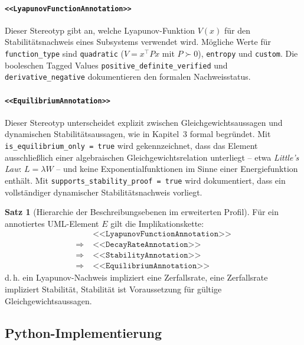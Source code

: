 ﻿\documentclass[a4paper,12pt]{report}
\theoremstyle{definition}
\newtheorem{satz}{Satz}[section]
\begin{document}
\paragraph{\texttt{<<LyapunovFunctionAnnotation>>}}

Dieser Stereotyp gibt an, welche Lyapunov-Funk\-tion $V(x)$ für den
Stabilitätsnachweis eines Subsystems verwendet wird. Mögliche Werte für
\texttt{function\_type} sind \texttt{quadratic} ($V = x^\top P x$ mit
$P \succ 0$), \texttt{entropy} und \texttt{custom}. Die booleschen Tagged
Values \texttt{positive\_definite\_verified} und
\texttt{derivative\_nega\newline tive} dokumentieren den formalen Nachweisstatus.

\paragraph{\texttt{<<EquilibriumAnnotation>>}}

Dieser Stereotyp unterscheidet explizit zwischen Gleichgewichtsaussagen und
dynamischen Stabilitätsaussagen, wie in Kapitel~3 formal begründet. Mit
\texttt{is\_equilibrium\_only = true} wird gekennzeichnet, dass das Element
ausschließlich einer algebraischen Gleichgewichtsrelation unterliegt -- etwa
\textit{Little's Law}: $L = \lambda W$ -- und keine Exponentialfunktionen
im Sinne einer Energiefunktion enthält. Mit
\texttt{supports\_stability\_proof = true} wird dokumentiert, dass ein
vollständiger dynamischer Stabilitätsnachweis vorliegt.

\begin{satz}[Hierarchie der Beschreibungsebenen im erweiterten Profil]
	Für ein annotiertes UML-Element $E$ gilt die Implikationskette:
	\[
	\begin{aligned}
		& \texttt{<<LyapunovFunctionAnnotation>>} \\
		\Rightarrow\; & \texttt{<<DecayRateAnnotation>>} \\
		\Rightarrow\; & \texttt{<<StabilityAnnotation>>} \\
		\Rightarrow\; & \texttt{<<EquilibriumAnnotation>>}
	\end{aligned}
	\]
	d.\,h. ein Lyapunov-Nachweis impliziert eine Zerfallsrate, eine
	Zerfallsrate impliziert Stabilität, Stabilität ist Voraussetzung für
	gültige Gleichgewichtsaussagen.
\end{satz}

\subsection{Python-Implementierung}
\end{document}
